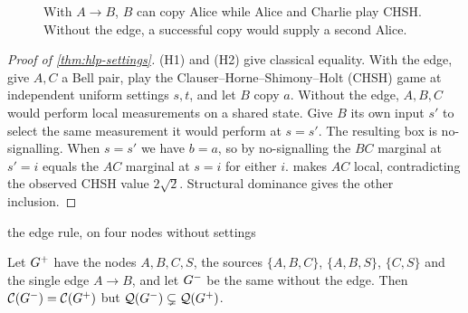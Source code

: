 \begin{figure}[H]
\centering
{}
\caption{With $A\to B$, $B$ can copy Alice while Alice and Charlie play CHSH. Without the edge, a successful copy would supply a second Alice.}
\label{fig:hlp-settings}
\end{figure}

\begin{proof}[Proof of \cref{thm:hlp-settings}]
(H1) and (H2) give classical equality. With the edge, give $A,C$ a Bell pair, play the Clauser--Horne--Shimony--Holt (CHSH) game at independent
uniform settings $s,t$, and let $B$ copy $a$. Without the edge, $A,B,C$ would perform local measurements
on a shared state. Give $B$ its own input $s'$ to select the same measurement it would perform at $s=s'$.
The resulting box is no-signalling. When $s=s'$ we have $b=a$, so by no-signalling the $BC$ marginal
at $s'=i$ equals the $AC$ marginal at $s=i$ for either $i$.  makes $AC$ local,
contradicting the observed CHSH value $2\sqrt2$. Structural dominance gives the other inclusion.
\end{proof}

\begin{cexbox}{the edge rule, on four nodes without settings}
\begin{theorem}\label{thm:hlp-four}
Let $G^{+}$ have the nodes $A,B,C,S$, the sources $\{A,B,C\}$, $\{A,B,S\}$, $\{C,S\}$ and the single edge
$A\to B$, and let $G^{-}$ be the same without the edge. Then $\mathcal{C}(G^{-})=\mathcal{C}(G^{+})$ but
$\mathcal{Q}(G^{-})\subsetneq\mathcal{Q}(G^{+})$.
\end{theorem}
\end{cexbox}

